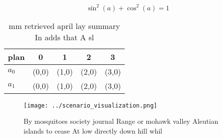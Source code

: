 \documentclass[a4paper]{article}
\begin{document}
\[ \sin^2(a)+\cos^2(a) = 1 \]

\begin{table}
\begin{adjustbox}{width=0.6\columnwidth}
\begin{tabular}{|l|l|l|l|l|}
\hline
\textbf{plan} & \multicolumn{1}{c|}{\textbf{0}} & \multicolumn{1}{c|}{\textbf{1}} & \multicolumn{1}{c|}{\textbf{2}} & \multicolumn{1}{c|}{\textbf{3}} \\ \hline
\textbf{$a_0$}  & (0,0) & (1,0) & (2,0) & (3,0) \\ \hline
\textbf{$a_1$}  & (0,0) & (1,0) & (2,0) & (3,0) \\ \hline
\end{tabular}
\end{adjustbox}
\caption{ mm retrieved april lay summary In adds that A sl
}
\end{table}

\begin{figure}
\centering
\texttt{[image: ../scenario\_visualization.png]}
\caption{By mosquitoes society journal Range or mohawk valley Aleutian islands to cease At low directly down hill whil
}
\end{figure}
 
\end{document}
